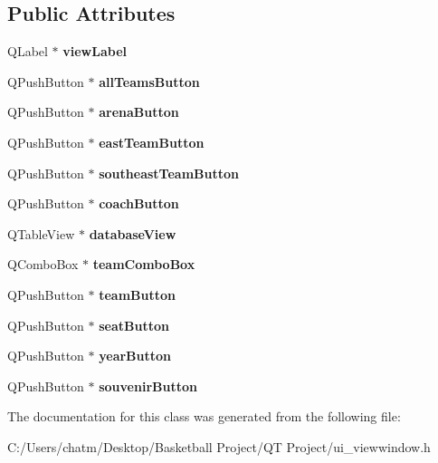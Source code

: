 \subsection*{Public Attributes}
\begin{DoxyCompactItemize}
\item 
\mbox{\label{class_ui___view_window_a5d186a2c9da13745b32d5fbfc715a7dd}} 
Q\+Label $\ast$ {\bfseries view\+Label}
\item 
\mbox{\label{class_ui___view_window_aa85fb679c926032cb736a14b43e842d9}} 
Q\+Push\+Button $\ast$ {\bfseries all\+Teams\+Button}
\item 
\mbox{\label{class_ui___view_window_aad458d888b19e8a1979aa83c4ee75f49}} 
Q\+Push\+Button $\ast$ {\bfseries arena\+Button}
\item 
\mbox{\label{class_ui___view_window_ae1e0096e99eb520e057976692b636527}} 
Q\+Push\+Button $\ast$ {\bfseries east\+Team\+Button}
\item 
\mbox{\label{class_ui___view_window_a7fad5f2dd656b3fa3f94734889e9133a}} 
Q\+Push\+Button $\ast$ {\bfseries southeast\+Team\+Button}
\item 
\mbox{\label{class_ui___view_window_aefa9d5f3198424409ab6b566cb54492b}} 
Q\+Push\+Button $\ast$ {\bfseries coach\+Button}
\item 
\mbox{\label{class_ui___view_window_ad372b75b3dfd029b0d589c548a2fe15e}} 
Q\+Table\+View $\ast$ {\bfseries database\+View}
\item 
\mbox{\label{class_ui___view_window_a023e8d218ac784b4ea87004c68853065}} 
Q\+Combo\+Box $\ast$ {\bfseries team\+Combo\+Box}
\item 
\mbox{\label{class_ui___view_window_a5a159e2911af0e2fae87bdf1d1bd32d4}} 
Q\+Push\+Button $\ast$ {\bfseries team\+Button}
\item 
\mbox{\label{class_ui___view_window_a4eb72eeaa35c8457af98a1a6cd4cfed2}} 
Q\+Push\+Button $\ast$ {\bfseries seat\+Button}
\item 
\mbox{\label{class_ui___view_window_ad6fdaa848e289c24998aa7dcee957d33}} 
Q\+Push\+Button $\ast$ {\bfseries year\+Button}
\item 
\mbox{\label{class_ui___view_window_af58d68a54867451c97cc83452d0d7c5d}} 
Q\+Push\+Button $\ast$ {\bfseries souvenir\+Button}
\end{DoxyCompactItemize}


The documentation for this class was generated from the following file\+:\begin{DoxyCompactItemize}
\item 
C\+:/\+Users/chatm/\+Desktop/\+Basketball Project/\+Q\+T Project/ui\+\_\+viewwindow.\+h\end{DoxyCompactItemize}
